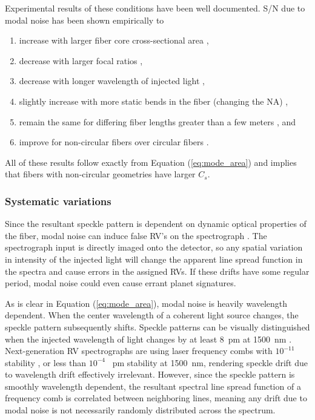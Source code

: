 \documentclass[11pt]{article}
\begin{document}
Experimental results of these conditions have been well documented. S/N due to modal noise has been shown empirically to
\begin{enumerate}
\item increase with larger fiber core cross-sectional area \cite{Lemke2010, Sablowski2016},
\item decrease with larger focal ratios \cite{Baudrand2001, Sablowski2016},
\item decrease with longer wavelength of injected light \cite{Baudrand2001},
\item slightly increase with more static bends in the fiber (changing the NA) \cite{Imai1979},
\item remain the same for differing fiber lengths greater than a few meters \cite{Baudrand2001}, and
\item improve for non-circular fibers over circular fibers \cite{Sablowski2016, Sturmer2016}.
\end{enumerate}
All of these results follow exactly from Equation (\ref{eq:mode_area}) and implies that fibers with non-circular geometries have larger $C_{s}$.

\subsubsection{Systematic variations}
\label{subsec:sys_var}

Since the resultant speckle pattern is dependent on dynamic optical properties of the fiber, modal noise can induce false RV's on the spectrograph \cite{Mahadevan2014}. The spectrograph input is directly imaged onto the detector, so any spatial variation in intensity of the injected light will change the apparent line spread function in the spectra and cause errors in the assigned RVs. If these drifts have some regular period, modal noise could even cause errant planet signatures.

As is clear in Equation (\ref{eq:mode_area}), modal noise is heavily wavelength dependent. When the center wavelength of a coherent light source changes, the speckle pattern subsequently shifts.  Speckle patterns can be visually distinguished when the injected wavelength of light changes by at least \SI{8}{\pico\meter} at \SI{1500}{\nano\meter} \cite{Redding2013}. Next-generation RV spectrographs are using laser frequency combs with $10^{-11}$ stability \cite{Probst2014}, or less than $10^{-4}$ \SI{}{\pico\meter} stability at \SI{1500}{\nano\meter}, rendering speckle drift due to wavelength drift effectively irrelevant. However, since the speckle pattern is smoothly wavelength dependent, the resultant spectral line spread function of a frequency comb is correlated between neighboring lines, meaning any drift due to modal noise is not necessarily randomly distributed across the spectrum.
\end{document}
